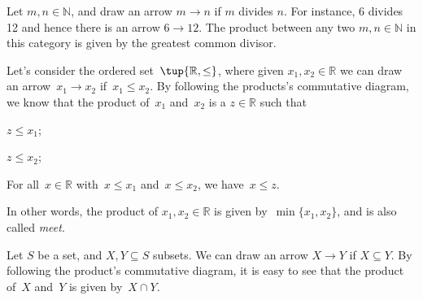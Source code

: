 \begin{example}
Let $m,n\in \mathbb{N}$, and draw an arrow $m\to n$ if $m$ divides $n$. For instance, 6 divides 12 and hence there is an arrow $6\to 12$. The product between any two $m,n\in \mathbb{N}$ in this category is given by the greatest common divisor. 
\end{example}

\begin{example}
Let's consider the ordered set~$\tup{\mathbb{R},\leq}$, where given $x_1,x_2\in \mathbb{R}$ we can draw an arrow~$x_1\to x_2$ if~$x_1\leq x_2$. By following the products's commutative diagram, we know that the product of~$x_1$ and~$x_2$ is a $z\in \mathbb{R}$ such that
\begin{compactitem}
\item $z\leq x_1$;
\item $z\leq x_2$;
\item For all~$x\in \mathbb{R}$ with~$x\leq x_1$ and~$x\leq x_2$, we have~$x\leq z$.
\end{compactitem}
In other words, the product of $x_1,x_2\in \mathbb{R}$ is given by~$\min\{x_1,x_2\}$, and is also called \emph{meet}.
\end{example}

\begin{example}
Let $S$ be a set, and $X,Y\subseteq S$ subsets. We can draw an arrow $X\to Y$ if $X\subseteq Y$. By following the product's commutative diagram, it is easy to see that the product of~$X$ and~$Y$ is given by~$X\cap Y$.
\end{example}

